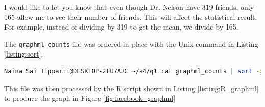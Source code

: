 \vspace*{5pt}

I would like to let you know that even though Dr. Nelson have 319 friends, only 165 allow me to see their number of friends. This will affect the statistical result. For example, instead of dividing by 319 to get the mean, we divide by 165.

The {\tt graphml\_counts} file was ordered in place with the Unix command in Listing \ref{listing:sort}. 
\\
\begin{lstlisting}[language=Bash,caption={Sort command},label=listing:sort]
Naina Sai Tipparti@DESKTOP-2FU7AJC ~/a4/q1 cat graphml_counts | sort -g -o graphml_counts
\end{lstlisting}

This file was then processed by the R script\cite{rscript} shown in Listing \ref{listing:R_graphml} to produce the graph in Figure \ref{fig:facebook_graphml}

